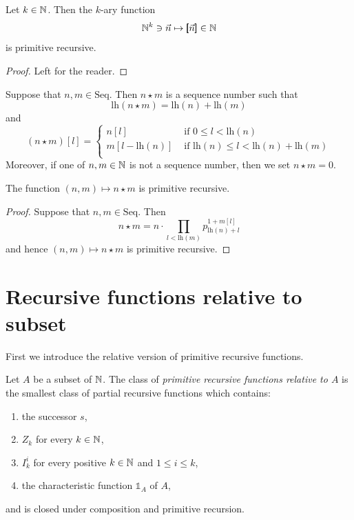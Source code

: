 \documentclass[10pt]{amsart}
\begin{document}
\begin{proposition}\label{proposition:sequence_encoding_is_primitive_recursive_function}
	Let $k\in {\mathbb N}$. Then the $k$-ary function
	$${\mathbb N}^k\ni \vec{n} \mapsto \pmb{[}\vec{n}\pmb{]}\in {\mathbb N}$$
	is primitive recursive.
\end{proposition}
\begin{proof}
	Left for the reader.
\end{proof}
\noindent
Suppose that $n,m\in \mathrm{Seq}$. Then $n\star m$ is a sequence number such that
$$\mathrm{lh}(n\star m) = \mathrm{lh}(n) + \mathrm{lh}(m)$$
and
$$\left(n\star m\right)[l] = \begin{cases}
		n[l]                  & \mbox{ if }0\leq l < \mathrm{lh}(n)                                \\
		m[l - \mathrm{lh}(n)] & \mbox{ if }\mathrm{lh}(n) \leq l < \mathrm{lh}(n) + \mathrm{lh}(m) \\
	\end{cases}$$
Moreover, if one of $n,m\in {\mathbb N}$ is not a sequence number, then we set $n\star m = 0$.

\begin{proposition}\label{proposition:concatenation_is_primitive_recursive}
	The function $(n,m) \mapsto n\star m$ is primitive recursive.
\end{proposition}
\begin{proof}
	Suppose that $n,m \in \mathrm{Seq}$. Then
	$$n\star m = n \cdot \prod_{l < \mathrm{lh}(m)}p_{\mathrm{lh}(n) + l}^{1 + m[l]}$$
	and hence $(n,m) \mapsto n\star m$ is primitive recursive.
\end{proof}

\section{Recursive functions relative to subset}
\noindent
First we introduce the relative version of primitive recursive functions.

\begin{definition}
	Let $A$ be a subset of ${\mathbb N}$. The class of \textit{primitive recursive functions relative to $A$} is the smallest class of partial recursive functions which contains:
	\begin{enumerate}[label=\textbf{(\arabic*)}, leftmargin=3.0em]
		\item the successor $s$,
		\item $Z_k$ for every $k \in {\mathbb N}$,
		\item $I^i_k$ for every positive $k \in {\mathbb N}$ and $1\leq i \leq k$,
		\item the characteristic function $\mathbb{1}_A$ of $A$,
	\end{enumerate}
	and is closed under composition and primitive recursion.
\end{definition}
\end{document}

